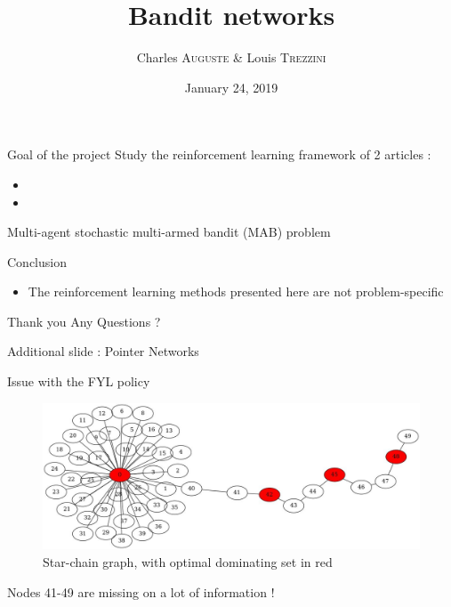 \documentclass{beamer}
\title{Bandit networks}
\date{January 24, 2019}
\author{Charles \textsc{Auguste} \& Louis \textsc{Trezzini}}
\begin{document}
\maketitle

\begin{frame}{Goal of the project}
Study the reinforcement learning framework of 2 articles :
\begin{itemize}
\item {}
\item {}
\end{itemize}
\end{frame}

\begin{frame}{Multi-agent stochastic multi-armed bandit (MAB) problem}
\end{frame}

\begin{frame}{Conclusion}
\begin{itemize}
\item The reinforcement learning methods presented here are \alert{not problem-specific}\end{itemize}
\end{frame}


\begin{frame}{Thank you}
\centering \Huge Any Questions ?
\end{frame}

\begin{frame}
\AtNextBibliography{\tiny}
\printbibliography
\end{frame}

\begin{frame}{Additional slide : Pointer Networks}

\end{frame}


\begin{frame}{Issue with the FYL policy}
\begin{figure}
\includegraphics[scale=0.25]{star-chain}
\caption{Star-chain graph, with optimal dominating set in red}
\end{figure}
Nodes 41-49 are \alert{missing on a lot of information} !
\end{frame}
\end{document}
